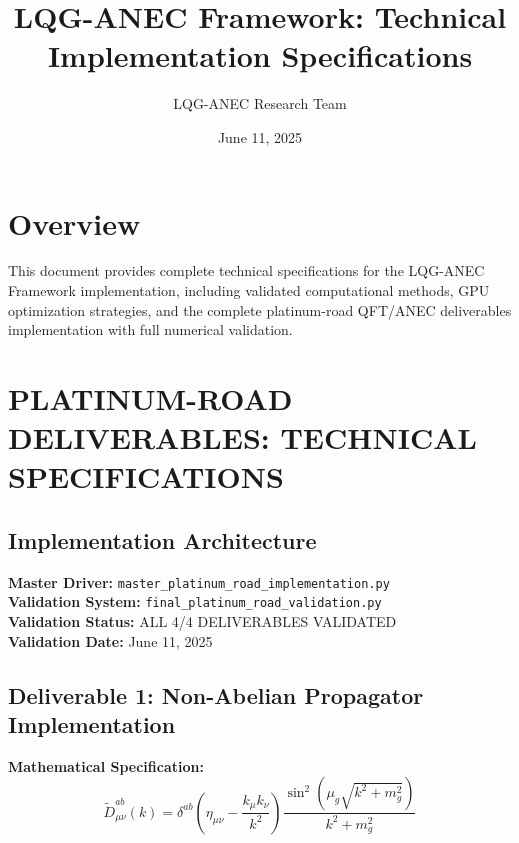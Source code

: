 \documentclass[11pt]{article}
\title{LQG-ANEC Framework: Technical Implementation Specifications}
\author{LQG-ANEC Research Team}
\date{June 11, 2025}
\begin{document}
\maketitle

\section{Overview}

This document provides complete technical specifications for the LQG-ANEC Framework implementation, including validated computational methods, GPU optimization strategies, and the complete platinum-road QFT/ANEC deliverables implementation with full numerical validation.

\section{PLATINUM-ROAD DELIVERABLES: TECHNICAL SPECIFICATIONS}

\subsection{Implementation Architecture}

\textbf{Master Driver:} \texttt{master\_platinum\_road\_implementation.py} \\
\textbf{Validation System:} \texttt{final\_platinum\_road\_validation.py} \\
\textbf{Validation Status:} ALL 4/4 DELIVERABLES VALIDATED \\
\textbf{Validation Date:} June 11, 2025

\subsection{Deliverable 1: Non-Abelian Propagator Implementation}

\textbf{Mathematical Specification:}
\begin{equation}
\boxed{\tilde{D}^{ab}_{\mu\nu}(k) = \delta^{ab} \left(\eta_{\mu\nu} - \frac{k_\mu k_\nu}{k^2}\right) \frac{\sin^2(\mu_g\sqrt{k^2 + m_g^2})}{k^2 + m_g^2}}
\end{equation}
\end{document}
